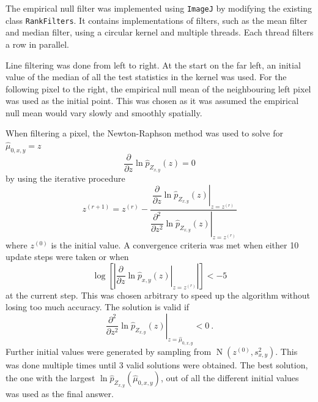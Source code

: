\documentclass{proc}
\DeclareMathOperator{\normal}{N}
\begin{document}
The empirical null filter was implemented using \texttt{ImageJ} \citep{abramoff2004image, schindelin2012fiji, schneider2012nih, perez2013image} by modifying the existing class \texttt{RankFilters}. It contains implementations of filters, such as the mean filter and median filter, using a circular kernel and multiple threads. Each thread filters a row in parallel.

Line filtering was done from left to right. At the start on the far left, an initial value of the median of all the test statistics in the kernel was used. For the following pixel to the right, the empirical null mean of the neighbouring left pixel was used as the initial point. This was chosen as it was assumed the empirical null mean would vary slowly and smoothly spatially.

When filtering a pixel, the Newton-Raphson method was used to solve for $\widehat{\mu}_{0,x,y}=z$
\begin{equation}
  \dfrac{\partial}{\partial z}\ln\widehat{p}_{Z_{x,y}}(z) = 0
\end{equation}
by using the iterative procedure
\begin{equation}
  z^{(r+1)} =
  z^{(r)}
  -\dfrac{
    \left.
      \dfrac{
        \partial
      }
      {
        \partial z
      }
      \ln\widehat{p}_{Z_{x,y}}(z)
    \right|_{z = z^{(r)}}
  }
  {
    \left.
      \dfrac{
        \partial^2
      }
      {
        \partial z^2
      }
      \ln\widehat{p}_{Z_{x,y}}(z)
    \right|_{z = z^{(r)}}
  } 
\end{equation}
where $z^{(0)}$ is the initial value. A convergence criteria was met when either 10 update steps were taken or when
\begin{equation}
  \log\left[\left|
    \left.
    \dfrac{
      \partial
    }
    {
      \partial z
    }
  \ln\widehat{p}_{x,y}(z)
  \right|_{z=z^{(r)}}
  \right|\right]
  <-5
\end{equation}
at the current step. This was chosen arbitrary to speed up the algorithm without losing too much accuracy. The solution is valid if
\begin{equation}
  \left.
    \dfrac{
      \partial^2
    }
    {
      \partial z^2
    }
    \ln\widehat{p}_{Z_{x,y}}(z)
  \right|_{z=\widehat{\mu}_{0,x,y}}
  < 0 \ .
\end{equation}
Further initial values were generated by sampling from $\normal(z^{(0)}, s_{x,y}^2)$. This was done multiple times until 3 valid solutions were obtained. The best solution, the one with the largest $\ln\widehat{p}_{Z_{x,y}}\left(\widehat{\mu}_{0,x,y}\right)$, out of all the different initial values was used as the final answer.
\end{document}

